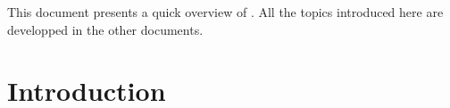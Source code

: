 

\newcommand{\mantitle}{\textsc{Overview} }


\tableofcontents

\newcommand{\bigcaps}[1]{\uppercase{#1}}


\newcommand{\bii}{\\}
\newcommand{\eii}{\\\\}
\newcommand{\oidx}{\emph{oid}}
\newcommand{\oid}{{\oidx} }
\newcommand{\class}[1]{class \texttt{#1}}
\newcommand{\instance}[1]{instance of the \class{#1}}
\newcommand{\instances}[1]{instances of the \class{#1}}



This document presents a quick overview of \eyedbX. All the topics introduced
here are developped in the other documents.

\section{Introduction}

